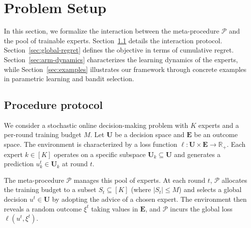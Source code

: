\documentclass[a4paper,14pt]{extarticle}
\theoremstyle{plain}
\begin{document}
\section{Problem Setup}

\label{sec:setup}
In this section, we formalize the interaction between the meta-procedure $\mathcal{P}$ and the pool of trainable experts. Section~\ref{sec:losses} details the interaction protocol. Section~\ref{sec:global-regret} defines the objective in terms of cumulative regret. Section~\ref{sec:arm-dynamics} characterizes the learning dynamics of the experts, while Section~\ref{sec:examples} illustrates our framework through concrete examples in parametric learning and bandit selection.

\vspace{-0.5em}
\subsection{Procedure protocol}
\label{sec:losses}
\vspace{-0.75em}

We consider a stochastic online decision-making problem with $K$ experts and a per-round training budget $M$. Let $\mathbf{U}$ be a decision space and $\mathbf{E}$ be an outcome space. The environment is characterized by a loss function $\ell: \mathbf{U} \times \mathbf{E} \to \mathbb{R}_+$. Each expert $k \in [K]$ operates on a specific subspace $\mathbf{U}_k \subseteq \mathbf{U}$ and generates a prediction $u_k^t \in \mathbf{U}_k$ at round $t$.

The meta-procedure $\mathcal{P}$ manages this pool of experts. At each round $t$, $\mathcal{P}$ allocates the training budget to a subset $S_t \subseteq [K]$ (where $|S_t| \le M$) and selects a global decision $u^t \in \mathbf{U}$ by adopting the advice of a chosen expert. The environment then reveals a random outcome $\xi^t$ taking values in $\mathbf{E}$, and $\mathcal{P}$ incurs the global loss $\ell(u^t, \xi^t)$.
\end{document}

